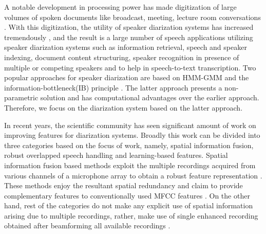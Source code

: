 \documentclass[conference]{IEEEtran}
\begin{document}
A notable development in processing power has made digitization of large volumes of spoken documents like broadcast, meeting, lecture room conversations \cite{reviewPaper2,reviewPaper3}. With this digitization, the utility of speaker diarization systems has increased tremendously \cite{reviewPaper1,reviewPaper4}, and the result is a large number of speech applications utilizing speaker diarization systems such as information retrieval, speech and speaker indexing, document content structuring, speaker recognition in presence of multiple or competing speakers and to help in speech-to-text transcription. Two popular approaches for speaker diarization are based on HMM-GMM \cite{reviewPaper1} and the information-bottleneck(IB) principle \cite{aIB2}. The latter approach presents a non-parametric solution and has computational advantages over the earlier approach. Therefore, we focus on the diarization system based on the latter approach.  

In recent years, the scientific community has seen significant amount of work on improving features for diarization systems. Broadly this work can be divided into three categories based on the focus of work, namely, spatial information fusion, robust overlapped speech handling and learning-based features. Spatial information fusion based methods exploit the multiple recordings acquired from various channels of a microphone array to obtain a robust feature representation \cite{aIB3,aIB4,featAngle,speakerUPM,featSpatial,MDM}. These methods enjoy the resultant spatial redundancy and claim to provide complementary features to conventionally used MFCC features \cite{MDM}. On the other hand, rest of the categories do not make any explicit use of spatial information arising due to multiple recordings, rather, make use of single enhanced recording obtained after beamforming all available recordings \cite{beamforming}. 
\end{document}
